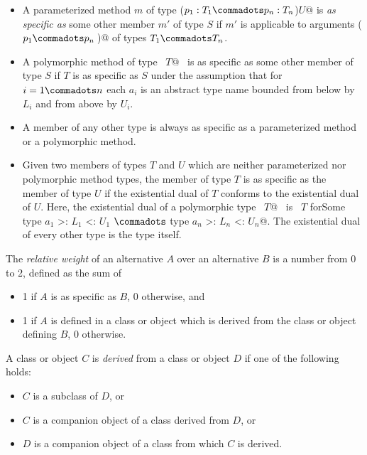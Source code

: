 

\begin{itemize} 
\item
A parameterized method $m$ of type \lstinline@($p_1:T_1\commadots p_n:T_n$)$U$@ is {\em as specific as} some other
member $m'$ of type $S$ if $m'$ is applicable to arguments
\lstinline@($p_1 \commadots p_n\,$)@ of
types $T_1 \commadots T_n$.
\item
A polymorphic method of type
~\lstinline@[$a_1$ >: $L_1$ <: $U_1 \commadots a_n$ >: $L_n$ <: $U_n$]$T$@~ is
as specific as some other member of type $S$ if $T$ is as 
specific as $S$ under the assumption that for
$i = 1 \commadots n$ each $a_i$ is an abstract type name
bounded from below by $L_i$ and from above by $U_i$.
\item
A member of any other type is always as specific as a parameterized method
or a polymorphic method.
\item 
Given two members of types $T$ and $U$ which are 
neither parameterized nor polymorphic method types, the member of type $T$ is as specific as
the member of type $U$ if the existential dual of $T$ conforms to the existential dual of $U$. 
Here, the existential dual of a polymorphic type 
~\lstinline@[$a_1$ >: $L_1$ <: $U_1 \commadots a_n$ >: $L_n$ <: $U_n$]$T$@~ is
~\lstinline@$T$ forSome { type $a_1$ >: $L_1$ <: $U_1$ $\commadots$ type $a_n$ >: $L_n$ <: $U_n$}@.
The existential dual of every other type is the type itself.
\end{itemize}

The {\em relative weight} of an alternative $A$ over an alternative $B$ is a
number from 0 to 2, defined as the sum of
\begin{itemize}
\item 1 if $A$ is as specific as $B$, 0 otherwise, and
\item 1 if $A$ is defined in a class or object which is derived
      from the class or object defining $B$, 0 otherwise.
\end{itemize}
A class or object $C$ is {\em derived} from a class or object $D$ if one of
the following holds:
\begin{itemize}
\item $C$ is a subclass of $D$, or
\item $C$ is a companion object of a class derived from $D$, or
\item $D$ is a companion object of a class from which $C$ is derived.
\end{itemize}

